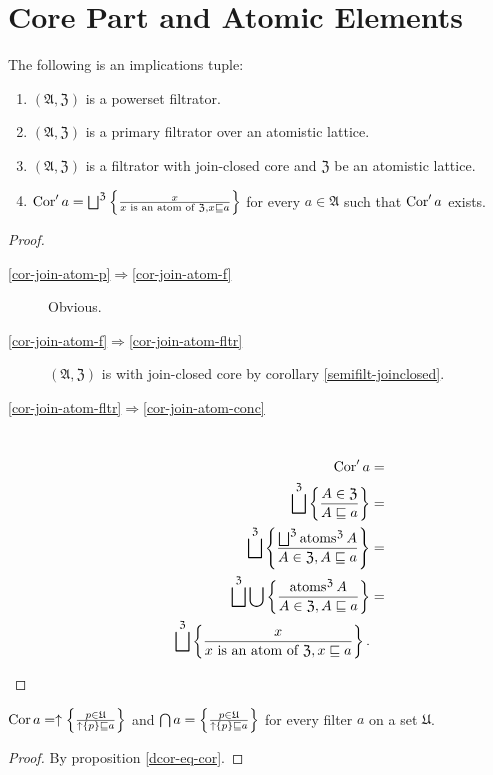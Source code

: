 \section{Core Part and Atomic Elements}
\begin{prop}
\label{cor-join-atom}The following is an implications tuple:
\begin{enumerate}
\item \label{cor-join-atom-p}$(\mathfrak{A},\mathfrak{Z})$ is a powerset
filtrator.
\item \label{cor-join-atom-f}$(\mathfrak{A},\mathfrak{Z})$ is a primary filtrator
over an atomistic lattice.
\item \label{cor-join-atom-fltr}$(\mathfrak{A},\mathfrak{Z})$ is a filtrator
with join-closed core and $\mathfrak{Z}$ be an atomistic lattice.
\item \label{cor-join-atom-conc}$\Cor'a=\bigsqcup^{\mathfrak{Z}}\setcond x{x\text{ is an atom of }\mathfrak{Z},x\sqsubseteq a}$
for every $a\in\mathfrak{A}$ such that $\operatorname{Cor}'a$ exists.
\end{enumerate}
\end{prop}
\begin{proof}
~
\begin{description}
\item [{\ref{cor-join-atom-p}$\Rightarrow$\ref{cor-join-atom-f}}] Obvious.
\item [{\ref{cor-join-atom-f}$\Rightarrow$\ref{cor-join-atom-fltr}}] $(\mathfrak{A},\mathfrak{Z})$
is with join-closed core by corollary \ref{semifilt-joinclosed}.
\item [{\ref{cor-join-atom-fltr}$\Rightarrow$\ref{cor-join-atom-conc}}] ~
\begin{align*}
\Cor'a & =\\
\bigsqcup^{\mathfrak{Z}}\setcond{A\in\mathfrak{Z}}{A\sqsubseteq a} & =\\
\bigsqcup^{\mathfrak{Z}}\setcond{\bigsqcup^{\mathfrak{Z}}\atoms^{\mathfrak{Z}}A}{A\in\mathfrak{Z},A\sqsubseteq a} & =\\
\bigsqcup^{\mathfrak{Z}}\bigcup\setcond{\atoms^{\mathfrak{Z}}A}{A\in\mathfrak{Z},A\sqsubseteq a} & =\\
\bigsqcup^{\mathfrak{Z}}\setcond x{x\text{ is an atom of }\mathfrak{Z},x\sqsubseteq a}.
\end{align*}

\end{description}
\end{proof}
\begin{cor}
$\operatorname{Cor} a=\uparrow\left\{ \frac{p\in\mathfrak{U}}{\uparrow\{p\}\sqsubseteq a}\right\}$
and $\bigcap a=\left\{ \frac{p\in\mathfrak{U}}{\uparrow\{p\}\sqsubseteq a}\right\}$
for every filter $a$ on a set $\mathfrak{U}$.\end{cor}
\begin{proof}
By proposition \ref{dcor-eq-cor}.
\end{proof}

